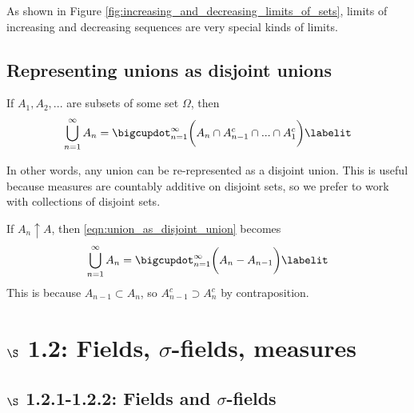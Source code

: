 \documentclass{article} %
\newcommand{\sfs}{$\sigma$-fields}
\begin{document}
As shown in Figure \ref{fig:increasing_and_decreasing_limits_of_sets}, limits of increasing and decreasing sequences are very special kinds of limits.


\subsection{Representing unions as disjoint unions} \label{sec:representing_unions_as_disjoint_unions}
 
\begin{remark}
If $A_1,A_2,...$ are subsets of some set $\Omega$, then
\begin{align*} 
\bigcup_{n=1}^\infty A_n = \bigcupdot_{n=1}^\infty \bigg(A_n \cap A_{n-1}^c \cap ... \cap A_1^c \bigg) 	
\labelit \label{eqn:union_as_disjoint_union}
\end{align*}

In other words, any union can be re-represented as a disjoint union. This is useful because measures are countably additive on disjoint sets, so we prefer to work with collections of disjoint sets.
\label{rk:rerepresenting_unions_as_disjoint_unions}
\end{remark}

\begin{remark}
If $A_n \uparrow A$, then \eqref{eqn:union_as_disjoint_union} becomes
\begin{align*}
	\bigcup_{n=1}^\infty A_n = \bigcupdot_{n=1}^\infty \bigg( A_n - A_{n-1} \bigg) 
\labelit \label{eqn:union_as_disjoint_union_for_increasing_sequences}
\end{align*}
This is because $A_{n-1} \subset A_{n}$, so $A_{n-1}^c \supset A_{n}^c$ by contraposition.	
\end{remark}

\section{$\S$ 1.2: Fields, \sfs, measures}

\subsection{$\S$ 1.2.1-1.2.2: Fields and \sfs}
\end{document}
